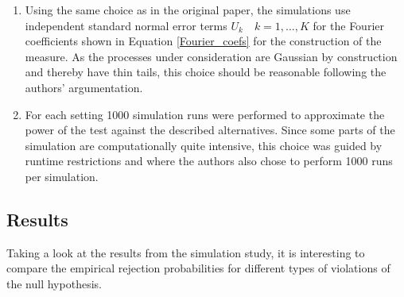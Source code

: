\documentclass[12pt, a4paper]{article}
\theoremstyle{MAstyle} \newtheorem{assumption}{Assumption}[section]
\theoremstyle{MAstyle} \newtheorem{definition}{Definition}[section]
\theoremstyle{MAstyle} \newtheorem{theorem}{Theorem}[section]
\begin{document}
{{\begin{enumerate}
			\item Using the same choice as in the original paper, the simulations use independent standard normal error terms $U_k \quad k=1, \dots, K$ for the Fourier coefficients shown in Equation \ref{Fourier_coefs} for the construction of the measure. As the processes under consideration are Gaussian by construction and thereby have thin tails, this choice should be reasonable following the authors' argumentation.
			\item For each setting 1000 simulation runs were performed to approximate the power of the test against the described alternatives. Since some parts of the simulation are computationally quite intensive, this choice was guided by runtime restrictions and \cite{bugni_permutation_2021} where the authors also chose to perform 1000 runs per simulation.
		\end{enumerate}
					}
	}
		\subsection{Results}
		Taking a look at the results from the simulation study, it is interesting to compare the empirical rejection probabilities for different types of violations of the null hypothesis.
		
\end{document}
